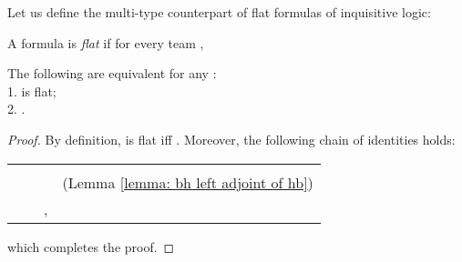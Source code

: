 \begin{comment}






Let us define the following translation :

\begin{center}
\begin{tabular}{r c l}
 && \\
 && \\
 && \\
 && .\\
\end{tabular}
\end{center}

\begin{lemma}
For every ,  .
\end{lemma}
\begin{proof}
By induction on the shape of .  If  for some , then . \marginnote{this proof uses that  commutes with ; this holds if we are in  rather than in .}

If , then . 

If , then  

If , then  

\end{proof}
Moreover, we define a translation map  as follows:
\begin{center}
\begin{tabular}{r c l c r c l}
 &  &  &&&\\
 &  &  & && \\
 &  &  & && \\
\end{tabular}
\end{center}
\marginnote{there is something wrong here.  is given twice. Maybe you wanted to 
???}
\end{comment}
Let us define the multi-type counterpart of flat formulas of  inquisitive logic: 
\begin{definition}
A formula  is {\em flat} if for every team , 
\end{definition}  
\begin{lemma}
\label{lemma:semantic flatness}
The following are equivalent for any :\\
1.  is flat;\\
2. .
\end{lemma}
\begin{proof}
By definition,  is flat iff  .
Moreover, the following chain of identities holds:
\begin{center}
\begin{tabular}{r c l l}
& & \\
& &  & (Lemma \ref{lemma: bh left adjoint of hb})\\
& & ,\\
\end{tabular}
\end{center}
which completes the proof.
\end{proof}

